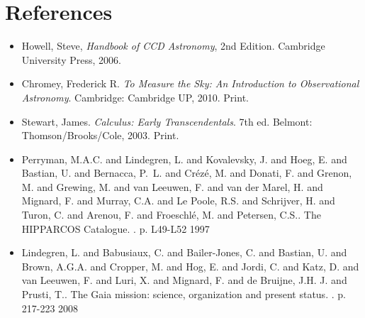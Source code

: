 \documentclass[authoryear, 12pt,5p, times]{elsarticle}
\begin{document}
 \section*{References}
 \begin{footnotesize}
 \begin{itemize}
\item Howell, Steve,  \textit{Handbook of CCD Astronomy}, 2nd Edition. Cambridge University Press, 2006.
\item Chromey, Frederick R. \textit{To Measure the Sky: An Introduction to Observational Astronomy}. Cambridge: Cambridge UP, 2010. Print.
\item Stewart, James. \textit{Calculus: Early Transcendentals}. 7th ed. Belmont: Thomson/Brooks/Cole, 2003. Print.
\item Perryman, M.A.C. and Lindegren, L. and Kovalevsky, J. and Hoeg, E. and Bastian, U. and Bernacca, P.~L. and Cr{\'ez\'e}, M. and Donati, F. and Grenon, M. and Grewing, M. and van Leeuwen, F. and van der Marel, H. and Mignard, F. and Murray, C.A. and Le Poole, R.S. and Schrijver, H. and Turon, C. and Arenou, F. and Froeschl{\'e}, M. and Petersen, C.S.. The HIPPARCOS Catalogue. . p. L49-L52 1997
\item  Lindegren, L. and Babusiaux, C. and Bailer-Jones, C. and Bastian, U. and Brown, A.G.A. and Cropper, M. and Hog, E. and Jordi, C. and Katz, D. and van Leeuwen, F. and Luri, X. and Mignard, F. and de Bruijne, J.H. J. and Prusti, T.. The Gaia mission: science, organization and present status. . p. 217-223 2008
\end{itemize}
% 
%
  \end{footnotesize}
\end{document}
